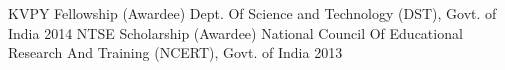 \begin{cvhonors}
 \cvhonor
    {KVPY Fellowship (Awardee)}
    {Dept. Of Science and Technology (DST), Govt. of India}
    {}
    {2014}
 \cvhonor
    {NTSE Scholarship (Awardee)}
    {National Council Of Educational Research And Training (NCERT), Govt. of India}
    {}
    {2013}
\end{cvhonors}
